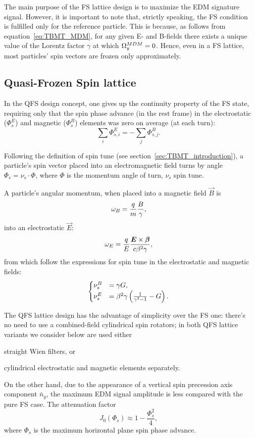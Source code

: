 The main purpose of the FS lattice design is to maximize the EDM signature signal. 
However, it is important to note that, strictly speaking, the FS condition is fulfilled only 
for the reference particle. This is because, as follows from
equation~\eqref{eq:TBMT_MDM}, for any given E- and B-fields there exists a unique value of 
the Lorentz factor $\gamma$ at which $\Omega_y^{MDM} = 0$. Hence, even in a FS lattice, 
most particles' spin vectors are frozen only approximately.

\subsection{Quasi-Frozen Spin lattice} \label{chpt2:concept:QFS}
In the QFS design concept, one gives up the continuity property of the FS state, 
requiring only that the spin phase advance (in the rest frame) in the electrostatic ($\Phi_s^E$) 
and magnetic ($\Phi_s^B$) elements was zero on average (at each turn):~\cite{Senichev:Lattices}
\begin{equation*}
	\sum_i \Phi_{s,i}^E = -\sum_j \Phi_{s,j}^B.
\end{equation*}

Following the definition of spin tune (see section~\ref{sec:TBMT_introduction}), a particle's spin vector
placed into an electromagnetic field turns by angle $\Phi_s = \nu_s \cdot \Phi$, where $\Phi$ is
the momentum angle of turn, $\nu_s$ spin tune.

A particle's angular momentum, when placed into a magnetic field $\vec B$ is
\[
\omega_B = \frac qm \frac B \gamma,
\]
into an electrostatic $\vec E$:
\[
\omega_E = \frac qE \frac{\boldsymbol E\times \boldsymbol\beta}{c\beta^2\gamma},
\]
from which follow the expressions for spin tune in the electrostatic and magnetic fields:
\begin{equation}
	\begin{cases}
		\nu_s^B &= \gamma G, \\
		\nu_s^E &= \beta^2\gamma\bkt{\frac{1}{\gamma^2-1} - G}.
	\end{cases}
\end{equation}

The QFS lattice design has the advantage of simplicity over the FS one: there's no need to use a combined-field
cylindrical spin rotators; in both QFS lattice variants we consider below are used either
\begin{enumerate*}[(i)]
\item straight Wien filters,  or
\item cylindrical electrostatic and magnetic elements separately.
\end{enumerate*}
On the other hand, due to the appearance of a vertical spin precession axis component $\bar n_y$,
the maximum EDM signal amplitude is less compared with the pure FS case. The attenuation
factor~\cite{Senichev:QFS_IPAC15}
\[
J_0(\Phi_s) \approx 1 - \frac{\Phi_s^2}{4},
\]
where $\Phi_s$ is the maximum horizontal plane spin phase advance. 

